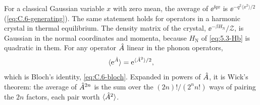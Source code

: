 For a classical Gaussian variable $x$ with zero mean, the average of $\ee^{\ii qx}$ is $\ee^{-q^2\langle x^2\rangle/2}$ (\cref{eq:C.6-generating}). The same statement holds for operators in a harmonic crystal in thermal equilibrium. The density matrix of the crystal, $\ee^{-\beta H_{\mathrm{N}}}/\mathcal{Z}$, is Gaussian in the normal coordinates and momenta, because $H_{\mathrm{N}}$ of \cref{eq:5.3-Hb} is quadratic in them. For any operator $\hat{A}$ linear in the phonon operators,
\begin{equation*}
  \langle\mathrm{e}^{\hat{A}}\rangle = \mathrm{e}^{\langle\hat{A}^2\rangle/2} ,
\end{equation*}
which is Bloch's identity, \cref{eq:C.6-bloch}. Expanded in powers of $\hat{A}$, it is Wick's theorem: the average of $\hat{A}^{2n}$ is the sum over the $(2n)!/(2^nn!)$ ways of pairing the $2n$ factors, each pair worth $\langle\hat{A}^2\rangle$.

